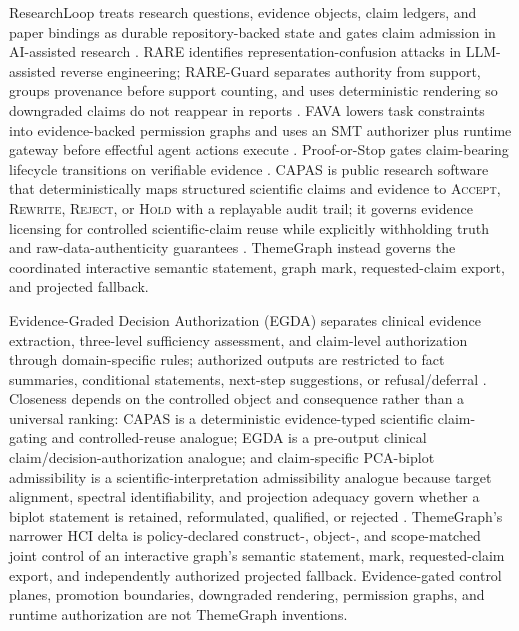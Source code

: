 \documentclass[manuscript,screen,review,anonymous]{acmart}
\begin{document}
ResearchLoop treats research questions, evidence objects, claim ledgers, and paper bindings as durable repository-backed state and gates claim admission in AI-assisted research \cite{researchloop2026}. RARE identifies representation-confusion attacks in LLM-assisted reverse engineering; RARE-Guard separates authority from support, groups provenance before support counting, and uses deterministic rendering so downgraded claims do not reappear in reports \cite{rare2026}. FAVA lowers task constraints into evidence-backed permission graphs and uses an SMT authorizer plus runtime gateway before effectful agent actions execute \cite{fava2026}. Proof-or-Stop gates claim-bearing lifecycle transitions on verifiable evidence \cite{prooforstop2026}. CAPAS is public research software that deterministically maps structured scientific claims and evidence to \textsc{Accept}, \textsc{Rewrite}, \textsc{Reject}, or \textsc{Hold} with a replayable audit trail; it governs evidence licensing for controlled scientific-claim reuse while explicitly withholding truth and raw-data-authenticity guarantees \cite{capas2026}. ThemeGraph instead governs the coordinated interactive semantic statement, graph mark, requested-claim export, and projected fallback.

Evidence-Graded Decision Authorization (EGDA) separates clinical evidence extraction, three-level sufficiency assessment, and claim-level authorization through domain-specific rules; authorized outputs are restricted to fact summaries, conditional statements, next-step suggestions, or refusal/deferral \cite{lin2026egda}. Closeness depends on the controlled object and consequence rather than a universal ranking: CAPAS is a deterministic evidence-typed scientific claim-gating and controlled-reuse analogue; EGDA is a pre-output clinical claim/decision-authorization analogue; and claim-specific PCA-biplot admissibility is a scientific-interpretation admissibility analogue because target alignment, spectral identifiability, and projection adequacy govern whether a biplot statement is retained, reformulated, qualified, or rejected \cite{pinto2026}. ThemeGraph's narrower HCI delta is policy-declared construct-, object-, and scope-matched joint control of an interactive graph's semantic statement, mark, requested-claim export, and independently authorized projected fallback. Evidence-gated control planes, promotion boundaries, downgraded rendering, permission graphs, and runtime authorization are not ThemeGraph inventions.
\end{document}
